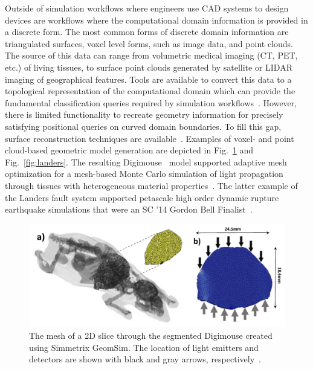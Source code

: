 Outside of simulation workflows where engineers use CAD systems to design
devices are workflows where the computational domain information is provided in
a discrete form.
The most common forms of discrete domain information are triangulated surfaces,
voxel level forms, such as image data, and point clouds.
The source of this data can range from volumetric medical imaging (CT, PET,
etc.) of living tissues, to surface point clouds generated by satellite or LIDAR
imaging of geographical features.
Tools are available to convert this data to a topological representation of the
computational domain which can provide the fundamental classification queries
required by simulation workflows~\cite{klaasVoxel2014}.
However, there is limited functionality to recreate geometry information for
precisely satisfying positional queries on curved domain boundaries.
To fill this gap, surface reconstruction techniques are
available~\cite{carrRBFpointCloud2001,rusuPointCloud2011}.
Examples of voxel- and point cloud-based geometric model generation are
depicted in Fig.~\ref{fig:mouse} and Fig.~\ref{fig:landers}.
The resulting Digimouse~\cite{digiMouse2007} model supported adaptive mesh optimization for a
mesh-based Monte Carlo simulation of light propagation through tissues with
heterogeneous material
properties~\cite{meshMonteCarlo2014,edmansMeshMonteCarlo2015}.
The latter example of the Landers fault system supported petascale high order
dynamic rupture earthquake simulations that were an SC '14 Gordon Bell
Finalist~\cite{seisSolGordonBell2014}.

\begin{figure} \centering
  \includegraphics[width=.8\textwidth]{figures/digimouse_edmans.png}
  \caption{The mesh of a 2D slice through the segmented Digimouse created using
    Simmetrix GeomSim.
    The location of light emitters and detectors are shown with black and gray
    arrows, respectively~\cite{edmansMeshMonteCarlo2015}.}
  \label{fig:mouse}
\end{figure}

